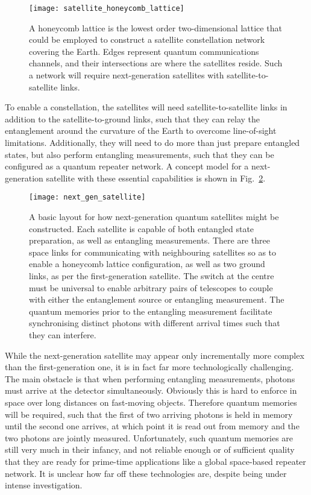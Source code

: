 \begin{figure}[!htb]
\texttt{[image: satellite\_honeycomb\_lattice]}
\caption{A honeycomb lattice is the lowest order two-dimensional lattice that could be employed to construct a satellite constellation network covering the Earth. Edges represent quantum communications channels, and their intersections are where the satellites reside. Such a network will require next-generation satellites with satellite-to-satellite links.}\label{fig:sat_honeycomb}	
\end{figure}

To enable a constellation, the satellites will need satellite-to-satellite links in addition to the satellite-to-ground links, such that they can relay the entanglement around the curvature of the Earth to overcome line-of-sight limitations. Additionally, they will need to do more than just prepare entangled states, but also perform entangling measurements, such that they can be configured as a quantum repeater network. A concept model for a next-generation satellite with these essential capabilities is shown in Fig.~\ref{fig:next_gen_sat}.

\begin{figure}[!htb]
\texttt{[image: next\_gen\_satellite]}
\caption{A basic layout for how next-generation quantum satellites might be constructed. Each satellite is capable of both entangled state preparation, as well as entangling measurements. There are three space links for communicating with neighbouring satellites so as to enable a honeycomb lattice configuration, as well as two ground links, as per the first-generation satellite. The switch at the centre must be universal to enable arbitrary pairs of telescopes to couple with either the entanglement source or entangling measurement. The quantum memories prior to the entangling measurement facilitate synchronising distinct photons with different arrival times such that they can interfere.}\label{fig:next_gen_sat}	
\end{figure}

While the next-generation satellite may appear only incrementally more complex than the first-generation one, it is in fact far more technologically challenging. The main obstacle is that when performing entangling measurements, photons must arrive at the detector simultaneously. Obviously this is hard to enforce in space over long distances on fast-moving objects. Therefore quantum memories will be required, such that the first of two arriving photons is held in memory until the second one arrives, at which point it is read out from memory and the two photons are jointly measured. Unfortunately, such quantum memories are still very much in their infancy, and not reliable enough or of sufficient quality that they are ready for prime-time applications like a global space-based repeater network. It is unclear how far off these technologies are, despite being under intense investigation.

